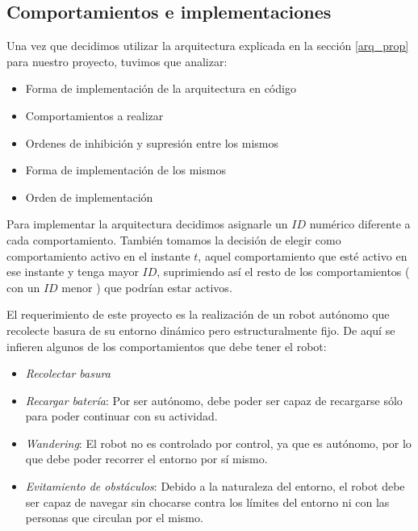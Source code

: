 
\subsection{Comportamientos e implementaciones}
\label{comportamientos}

Una vez que decidimos utilizar la arquitectura explicada en la secci\'on \ref{arq_prop} para nuestro proyecto, tuvimos que analizar:
\begin{itemize}
\item{}Forma de implementaci\'on de la arquitectura en c\'odigo
\item{}Comportamientos a realizar
\item{}Ordenes de inhibici\'on y supresi\'on entre los mismos
\item{}Forma de implementaci\'on de los mismos
\item{}Orden de implementaci\'on
\end{itemize}

Para implementar la arquitectura decidimos asignarle un $ID$ num\'erico diferente a cada comportamiento.
Tambi\'en tomamos la decisi\'on de elegir como comportamiento activo en el instante $t$,
aquel comportamiento que est\'e activo en ese instante y tenga mayor $ID$,
suprimiendo as\'i el resto de los comportamientos ( con un $ID$ menor ) que podr\'ian estar activos.

El requerimiento de este proyecto es la realizaci\'on de un robot aut\'onomo que recolecte
basura de su entorno din\'amico pero estructuralmente fijo. De aqu\'i se infieren algunos de los
comportamientos que debe tener el robot:
\begin{itemize}
	\item{\emph{Recolectar basura}}
	\item{\emph{Recargar bater\'ia}:} Por ser aut\'onomo, debe poder ser capaz de recargarse s\'olo
								para poder continuar con su actividad.
	\item{\emph{Wandering}:} El robot no es controlado por control, ya que es aut\'onomo, por lo que
						debe poder recorrer el entorno por s\'i mismo.
	\item{\emph{Evitamiento de obst\'aculos}:} Debido a la naturaleza del entorno, el robot debe
						ser capaz de navegar sin chocarse contra los l\'imites del entorno
						ni con las personas que circulan por el mismo.
\end{itemize}

